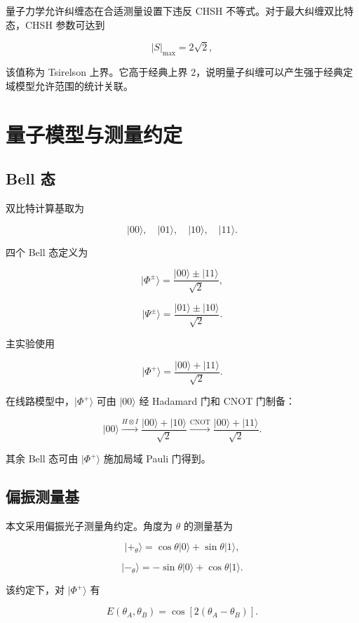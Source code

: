 \documentclass{zjureport}
\begin{document}
量子力学允许纠缠态在合适测量设置下违反 CHSH 不等式。对于最大纠缠双比特态，CHSH 参数可达到

\[
|S|_{\max}=2\sqrt{2},
\]

该值称为 Tsirelson 上界。它高于经典上界 \(2\)，说明量子纠缠可以产生强于经典定域模型允许范围的统计关联。

\clearpage

\section{量子模型与测量约定}\label{ux91cfux5b50ux6a21ux578bux4e0eux6d4bux91cfux7ea6ux5b9a}

\subsection{Bell 态}\label{bell-ux6001}

双比特计算基取为

\[
|00\rangle,\quad |01\rangle,\quad |10\rangle,\quad |11\rangle.
\]

四个 Bell 态定义为

\[
|\Phi^\pm\rangle=\frac{|00\rangle\pm|11\rangle}{\sqrt{2}},
\]

\[
|\Psi^\pm\rangle=\frac{|01\rangle\pm|10\rangle}{\sqrt{2}}.
\]

主实验使用

\[
|\Phi^+\rangle=\frac{|00\rangle+|11\rangle}{\sqrt{2}}.
\]

在线路模型中，\(|\Phi^+\rangle\) 可由 \(|00\rangle\) 经 Hadamard 门和 CNOT 门制备：

\[
|00\rangle
\xrightarrow{H\otimes I}
\frac{|00\rangle+|10\rangle}{\sqrt{2}}
\xrightarrow{\mathrm{CNOT}}
\frac{|00\rangle+|11\rangle}{\sqrt{2}}.
\]

其余 Bell 态可由 \(|\Phi^+\rangle\) 施加局域 Pauli 门得到。

\subsection{偏振测量基}\label{ux504fux632fux6d4bux91cfux57fa}

本文采用偏振光子测量角约定。角度为 \(\theta\) 的测量基为

\[
|+_\theta\rangle=\cos\theta|0\rangle+\sin\theta|1\rangle,
\]

\[
|-_\theta\rangle=-\sin\theta|0\rangle+\cos\theta|1\rangle.
\]

该约定下，对 \(|\Phi^+\rangle\) 有

\[
E(\theta_A,\theta_B)=\cos[2(\theta_A-\theta_B)].
\]
\end{document}
